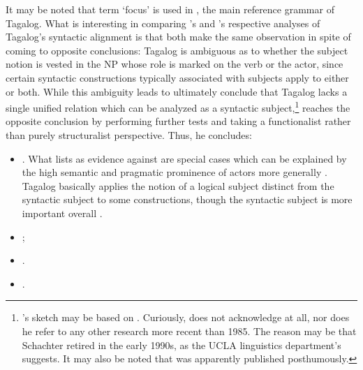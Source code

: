 It may be noted that term `focus' is used in \citet{schachterotanes1972}, the
main reference grammar of Tagalog. What is interesting in comparing
\citet{schachter2015}'s and \citet{kroeger1991}'s respective analyses of
Tagalog's syntactic alignment is that both make the same observation in spite
of coming to opposite conclusions: Tagalog is ambiguous as to whether the
subject notion is vested in the NP whose role is marked on the verb or the
actor, since certain syntactic constructions typically associated with subjects
apply to either or both. While this ambiguity leads
\textcites{schachter1976}{schachter2015} to ultimately conclude that Tagalog
lacks a single unified relation which can be analyzed as a syntactic
subject,\footnote{\citet{cowan1995}'s sketch may be based on
\citet{schachter1976}. Curiously, \citet{schachter2015} does not acknowledge
\citet{kroeger1991} at all, nor does he refer to any other research more recent
than 1985. The reason may be that Schachter retired in the early 1990s, as the
UCLA linguistics department's \citet{uclalingdepthist} suggests. It may also be
noted that \citet{schachter2015} was apparently published posthumously.}
\citet{kroeger1991} reaches the opposite conclusion by performing further tests
and taking a functionalist rather than purely structuralist perspective. Thus,
he concludes:

\begin{itemize}
	\item {}. What \citet{schachter1976} lists as evidence against are
		special cases which can be explained by the high semantic and pragmatic
		prominence of actors more generally \citep[225]{kroeger1991}. Tagalog
		basically applies the notion of a logical subject distinct from the
		syntactic subject to some constructions, though the syntactic subject
		is more important overall \citep[36]{kroeger1991}.
	\item {};
	\item {}.
	\item {}.
\end{itemize}

